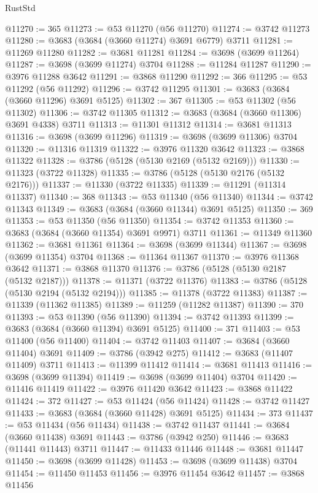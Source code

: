 \begin{lexlean}{RustStd}
\begin{coremodule}
@11270 := 365
@11273 := @53 @11270 (@56 @11270)
@11274 := @3742 @11273
@11280 := @3683 (@3684 (@3660 @11274) @3691 @6779) @3711
@11281 := @11269 @11280
@11282 := @3681 @11281
@11284 := @3698 (@3699 @11264)
@11287 := @3698 (@3699 @11274) @3704
@11288 := @11284 @11287
@11290 := @3976 @11288 @3642
@11291 := @3868 @11290
@11292 := 366
@11295 := @53 @11292 (@56 @11292)
@11296 := @3742 @11295
@11301 := @3683 (@3684 (@3660 @11296) @3691 @5125)
@11302 := 367
@11305 := @53 @11302 (@56 @11302)
@11306 := @3742 @11305
@11312 := @3683 (@3684 (@3660 @11306) @3691 @4338) @3711
@11313 := @11301 @11312
@11314 := @3681 @11313
@11316 := @3698 (@3699 @11296)
@11319 := @3698 (@3699 @11306) @3704
@11320 := @11316 @11319
@11322 := @3976 @11320 @3642
@11323 := @3868 @11322
@11328 := @3786 (@5128 (@5130 @2169 (@5132 @2169)))
@11330 := @11323 (@3722 @11328)
@11335 := @3786 (@5128 (@5130 @2176 (@5132 @2176)))
@11337 := @11330 (@3722 @11335)
@11339 := @11291 (@11314 @11337)
@11340 := 368
@11343 := @53 @11340 (@56 @11340)
@11344 := @3742 @11343
@11349 := @3683 (@3684 (@3660 @11344) @3691 @5125)
@11350 := 369
@11353 := @53 @11350 (@56 @11350)
@11354 := @3742 @11353
@11360 := @3683 (@3684 (@3660 @11354) @3691 @9971) @3711
@11361 := @11349 @11360
@11362 := @3681 @11361
@11364 := @3698 (@3699 @11344)
@11367 := @3698 (@3699 @11354) @3704
@11368 := @11364 @11367
@11370 := @3976 @11368 @3642
@11371 := @3868 @11370
@11376 := @3786 (@5128 (@5130 @2187 (@5132 @2187)))
@11378 := @11371 (@3722 @11376)
@11383 := @3786 (@5128 (@5130 @2194 (@5132 @2194)))
@11385 := @11378 (@3722 @11383)
@11387 := @11339 (@11362 @11385)
@11389 := @11259 (@11282 @11387)
@11390 := 370
@11393 := @53 @11390 (@56 @11390)
@11394 := @3742 @11393
@11399 := @3683 (@3684 (@3660 @11394) @3691 @5125)
@11400 := 371
@11403 := @53 @11400 (@56 @11400)
@11404 := @3742 @11403
@11407 := @3684 (@3660 @11404) @3691
@11409 := @3786 (@3942 @275)
@11412 := @3683 (@11407 @11409) @3711
@11413 := @11399 @11412
@11414 := @3681 @11413
@11416 := @3698 (@3699 @11394)
@11419 := @3698 (@3699 @11404) @3704
@11420 := @11416 @11419
@11422 := @3976 @11420 @3642
@11423 := @3868 @11422
@11424 := 372
@11427 := @53 @11424 (@56 @11424)
@11428 := @3742 @11427
@11433 := @3683 (@3684 (@3660 @11428) @3691 @5125)
@11434 := 373
@11437 := @53 @11434 (@56 @11434)
@11438 := @3742 @11437
@11441 := @3684 (@3660 @11438) @3691
@11443 := @3786 (@3942 @250)
@11446 := @3683 (@11441 @11443) @3711
@11447 := @11433 @11446
@11448 := @3681 @11447
@11450 := @3698 (@3699 @11428)
@11453 := @3698 (@3699 @11438) @3704
@11454 := @11450 @11453
@11456 := @3976 @11454 @3642
@11457 := @3868 @11456

\end{coremodule}
\end{lexlean}
